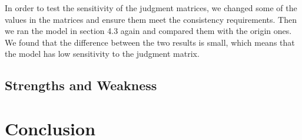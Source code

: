 \documentclass{mcmthesis}
\begin{document}
In order to test the sensitivity of the judgment matrices, we changed some of the values in the matrices and ensure them meet the consistency requirements. Then we ran the model in section 4.3 again and compared them with the origin ones. We found that the difference between the two results is small, which means that the model has low sensitivity to the judgment matrix.

\subsection{Strengths and Weakness}
\section{Conclusion}


\newpage
\end{document}
